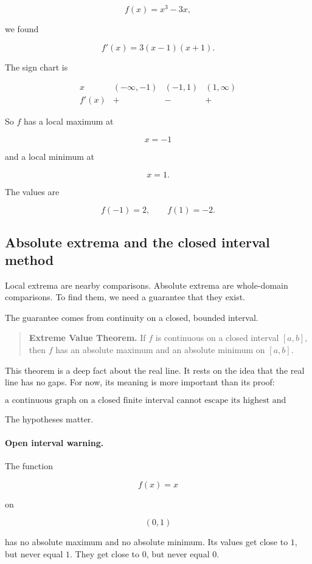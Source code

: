 \[
f(x)=x^3-3x,
\]

we found

\[
f'(x)=3(x-1)(x+1).
\]

The sign chart is

\[
\begin{array}{c|ccc}
x & (-\infty,-1) & (-1,1) & (1,\infty) \\ \hline
f'(x) & + & - & +
\end{array}
\]

So \(f\) has a local maximum at

\[
x=-1
\]

and a local minimum at

\[
x=1.
\]

The values are

\[
f(-1)=2,
\qquad
f(1)=-2.
\]

\subsection{Absolute extrema and the closed interval method}
\label{subsec:closed-interval-method}

Local extrema are nearby comparisons.  Absolute extrema are whole-domain
comparisons.  To find them, we need a guarantee that they exist.

The guarantee comes from continuity on a closed, bounded interval.

\begin{quote}
\textbf{Extreme Value Theorem.}
If \(f\) is continuous on a closed interval \([a,b]\), then \(f\) has an absolute
maximum and an absolute minimum on \([a,b]\).
\end{quote}

This theorem is a deep fact about the real line.  It rests on the idea that the real
line has no gaps.  For now, its meaning is more important than its proof:

\[
\text{a continuous graph on a closed finite interval cannot escape its highest and lowest values.}
\]

The hypotheses matter.

\paragraph{Open interval warning.}
The function

\[
f(x)=x
\]

on

\[
(0,1)
\]

has no absolute maximum and no absolute minimum.  Its values get close to \(1\),
but never equal \(1\).  They get close to \(0\), but never equal \(0\).

